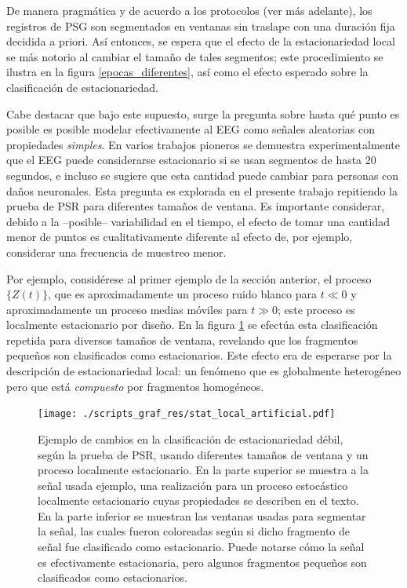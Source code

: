\documentclass[12pt,letterpaper]{book}
\begin{document}
De manera pragmática y de acuerdo a los protocolos (ver más adelante), los registros de PSG son segmentados en ventanas sin traslape con una duración fija decidida a priori.
%
Así entonces, se espera que el efecto de la estacionariedad local se más notorio al cambiar el tamaño de tales segmentos; este procedimiento se ilustra en la figura \ref{epocas_diferentes}, así como el efecto esperado sobre la clasificación de estacionariedad.


Cabe destacar que bajo este supuesto, surge la pregunta sobre hasta qué punto es posible es posible modelar efectivamente al EEG como señales aleatorias con propiedades \textit{simples}.
%
En varios trabajos pioneros \cite{Cohen77,Kawabata73,McEwen75,Sugimoto78} se demuestra experimentalmente que el EEG puede considerarse estacionario si se usan segmentos de hasta 20 segundos, e incluso se sugiere que esta cantidad puede cambiar para personas con daños neuronales.
%
Esta pregunta es explorada en el presente trabajo repitiendo la prueba de PSR para diferentes tamaños de ventana.
%
Es importante considerar, debido a la --posible-- variabilidad en el tiempo, el efecto de tomar una cantidad menor de puntos es cualitativamente diferente al efecto de, por ejemplo, considerar una frecuencia de muestreo menor.

Por ejemplo, considérese al primer ejemplo de la sección anterior, el proceso $\{Z(t)\}$, que es aproximadamente un proceso ruido blanco para $t\ll 0$ y aproximadamente un proceso medias móviles para $t \gg 0$; este proceso es localmente estacionario por diseño.
%
En la figura \ref{lazy_fin} se efectúa esta clasificación repetida para diversos tamaños de ventana, revelando que los fragmentos pequeños son clasificados como estacionarios.
%
Este efecto era de esperarse por la descripción de estacionariedad local: un fenómeno que es globalmente heterogéneo pero que está \textit{compuesto} por fragmentos homogéneos.

\begin{figure}
\centering
\texttt{[image: ./scripts\_graf\_res/stat\_local\_artificial.pdf]}
\caption[Ejemplo de cambios en la clasificación de estacionariedad débil al cambiar el tamaño de ventana]{Ejemplo de cambios en la clasificación de estacionariedad débil, según la prueba de PSR, usando diferentes tamaños de ventana y un proceso localmente estacionario.
%
En la parte superior se muestra a la señal usada ejemplo, una realización para un proceso estocástico localmente estacionario cuyas propiedades se describen en el texto.
%
En la parte inferior se muestran las ventanas usadas para segmentar la señal, las cuales fueron coloreadas según si dicho fragmento de señal fue clasificado como estacionario.
%
Puede notarse cómo la señal es efectivamente estacionaria, pero algunos fragmentos pequeños son clasificados como estacionarios.
}
\label{lazy_fin}
\end{figure}
\end{document}
